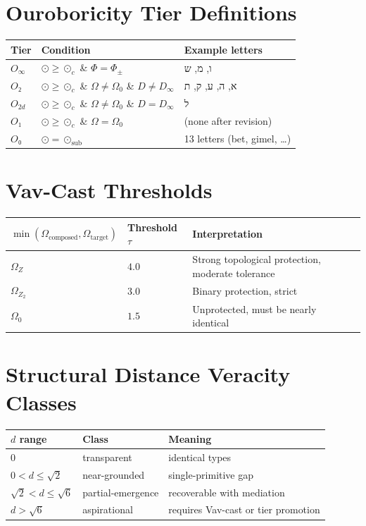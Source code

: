 \documentclass[10pt,a4paper]{article}
\newcommand{\heb}[1]{{\hebrewfont #1}}
\begin{document}
\section*{Ouroboricity Tier Definitions}

\begin{tabular}{ @{} l l l @{}}
\toprule
Tier & Condition & Example letters \\
\midrule
$O_\infty$ & $\odot \ge \odot_c$ \& $\Phi = \Phi_{\pm}$ & \heb{ו}, \heb{מ}, \heb{ש} \\
$O₂$      & $\odot \ge \odot_c$ \& $\Omega \neq \Omega_0$ \& $D \neq D_\infty$ & \heb{א}, \heb{ה}, \heb{ע}, \heb{ק}, \heb{ת} \\
$O_{2d}$   & $\odot \ge \odot_c$ \& $\Omega \neq \Omega_0$ \& $D = D_\infty$ & \heb{ל} \\
$O₁$      & $\odot \ge \odot_c$ \& $\Omega = \Omega_0$ & (none after revision) \\
$O₀$      & $\odot = \odot_{\text{sub}}$ & 13 letters (bet, gimel, \ldots) \\
\bottomrule
\end{tabular}

\section*{Vav-Cast Thresholds}

\begin{tabular}{ @{} l l l @{}}
\toprule
$\min(\Omega_{\text{composed}}, \Omega_{\text{target}})$ & Threshold $\tau$ & Interpretation \\
\midrule
$\Omega_Z$   & $4.0$ & Strong topological protection, moderate tolerance \\
$\Omega_{Z_2}$ & $3.0$ & Binary protection, strict \\
$\Omega_0$   & $1.5$ & Unprotected, must be nearly identical \\
\bottomrule
\end{tabular}

\section*{Structural Distance Veracity Classes}

\begin{tabular}{ @{} l l l @{}}
\toprule
$d$ range & Class & Meaning \\
\midrule
$0$            & transparent & identical types \\
$0 < d \le \sqrt{2}$ & near-grounded & single-primitive gap \\
$\sqrt{2} < d \le \sqrt{6}$ & partial-emergence & recoverable with mediation \\
$d > \sqrt{6}$ & aspirational & requires Vav-cast or tier promotion \\
\bottomrule
\end{tabular}
\end{document}
